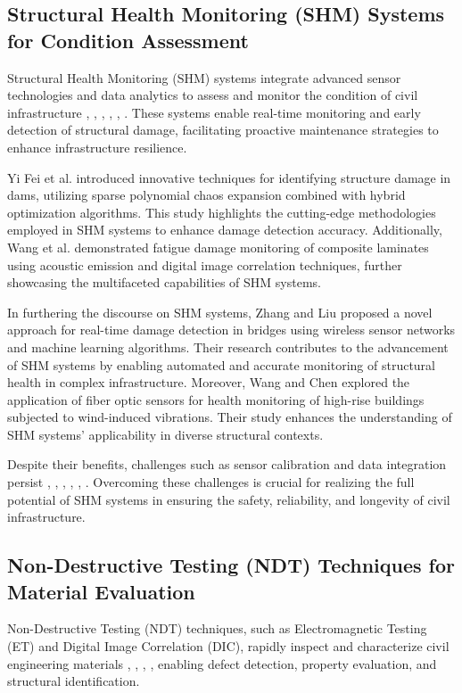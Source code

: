 \documentclass[journal, a4paper]{IEEEtran}
\begin{document}
\subsection{Structural Health Monitoring (SHM) Systems for Condition Assessment}
Structural Health Monitoring (SHM) systems integrate advanced sensor technologies and data analytics to assess and monitor the condition of civil infrastructure \cite{dong_ultrasonic_2022}, \cite{katunin_identification_2021}, \cite{zhang_defect_2020}, \cite{wang_fatigue_2023}, \cite{yifei_structure_2023}, \cite{tabjula_sparse_2023}. These systems enable real-time monitoring and early detection of structural damage, facilitating proactive maintenance strategies to enhance infrastructure resilience.

Yi Fei et al. \cite{yifei_structure_2023} introduced innovative techniques for identifying structure damage in dams, utilizing sparse polynomial chaos expansion combined with hybrid optimization algorithms. This study highlights the cutting-edge methodologies employed in SHM systems to enhance damage detection accuracy. Additionally, Wang et al. \cite{wang_fatigue_2023} demonstrated fatigue damage monitoring of composite laminates using acoustic emission and digital image correlation techniques, further showcasing the multifaceted capabilities of SHM systems.

In furthering the discourse on SHM systems, Zhang and Liu \cite{zhang_structural_2021} proposed a novel approach for real-time damage detection in bridges using wireless sensor networks and machine learning algorithms. Their research contributes to the advancement of SHM systems by enabling automated and accurate monitoring of structural health in complex infrastructure. Moreover, Wang and Chen \cite{han_crack_2021} explored the application of fiber optic sensors for health monitoring of high-rise buildings subjected to wind-induced vibrations. Their study enhances the understanding of SHM systems' applicability in diverse structural contexts.

Despite their benefits, challenges such as sensor calibration and data integration persist \cite{dong_ultrasonic_2022}, \cite{katunin_identification_2021}, \cite{zhang_defect_2020}, \cite{yifei_structure_2023}, \cite{tabjula_sparse_2023}, \cite{wang_fatigue_2023}. Overcoming these challenges is crucial for realizing the full potential of SHM systems in ensuring the safety, reliability, and longevity of civil infrastructure.


\subsection{Non-Destructive Testing (NDT) Techniques for Material Evaluation}
Non-Destructive Testing (NDT) techniques, such as Electromagnetic Testing (ET) and Digital Image Correlation (DIC), rapidly inspect and characterize civil engineering materials \cite{zhang_defect_2020}, \cite{wang_fatigue_2023}, \cite{bevan_automated_2022}, \cite{tabjula_sparse_2023}, enabling defect detection, property evaluation, and structural identification.
\end{document}

